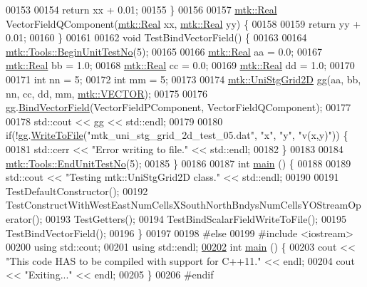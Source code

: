 \begin{DoxyCode}
00153 
00154   \textcolor{keywordflow}{return} xx + 0.01;
00155 \}
00156 
00157 \hyperlink{group__c01-roots_gac080bbbf5cbb5502c9f00405f894857d}{mtk::Real} VectorFieldQComponent(\hyperlink{group__c01-roots_gac080bbbf5cbb5502c9f00405f894857d}{mtk::Real} xx, \hyperlink{group__c01-roots_gac080bbbf5cbb5502c9f00405f894857d}{mtk::Real} yy) \{
00158 
00159   \textcolor{keywordflow}{return} yy + 0.01;
00160 \}
00161 
00162 \textcolor{keywordtype}{void} TestBindVectorField() \{
00163 
00164   \hyperlink{classmtk_1_1Tools_a26ee906d28523378522a75e25c3a4e19}{mtk::Tools::BeginUnitTestNo}(5);
00165 
00166   \hyperlink{group__c01-roots_gac080bbbf5cbb5502c9f00405f894857d}{mtk::Real} aa = 0.0;
00167   \hyperlink{group__c01-roots_gac080bbbf5cbb5502c9f00405f894857d}{mtk::Real} bb = 1.0;
00168   \hyperlink{group__c01-roots_gac080bbbf5cbb5502c9f00405f894857d}{mtk::Real} cc = 0.0;
00169   \hyperlink{group__c01-roots_gac080bbbf5cbb5502c9f00405f894857d}{mtk::Real} dd = 1.0;
00170 
00171   \textcolor{keywordtype}{int} nn = 5;
00172   \textcolor{keywordtype}{int} mm = 5;
00173 
00174   \hyperlink{classmtk_1_1UniStgGrid2D}{mtk::UniStgGrid2D} gg(aa, bb, nn, cc, dd, mm, \hyperlink{namespacemtk_ga4c54f2a329cfb4e56213b02a259d19e2a3d8cb27a993651a74d67fb8c98ae91b2}{mtk::VECTOR});
00175 
00176   gg.\hyperlink{classmtk_1_1UniStgGrid2D_a1cba89c285973514c1351760d598c52b}{BindVectorField}(VectorFieldPComponent, VectorFieldQComponent);
00177 
00178   std::cout << gg << std::endl;
00179 
00180   \textcolor{keywordflow}{if}(!gg.\hyperlink{classmtk_1_1UniStgGrid2D_a3507e3cf41631e5a5801af8ee6e233b0}{WriteToFile}(\textcolor{stringliteral}{"mtk\_uni\_stg\_grid\_2d\_test\_05.dat"}, \textcolor{stringliteral}{"x"}, \textcolor{stringliteral}{"y"}, \textcolor{stringliteral}{"v(x,y)"})) \{
00181     std::cerr << \textcolor{stringliteral}{"Error writing to file."} << std::endl;
00182   \}
00183 
00184   \hyperlink{classmtk_1_1Tools_ad8cf0085133dd40c913fe195bc5b9694}{mtk::Tools::EndUnitTestNo}(5);
00185 \}
00186 
00187 \textcolor{keywordtype}{int} \hyperlink{mtk__uni__stg__grid__2d__test_8cc_ae66f6b31b5ad750f1fe042a706a4e3d4}{main} () \{
00188 
00189   std::cout << \textcolor{stringliteral}{"Testing mtk::UniStgGrid2D class."} << std::endl;
00190 
00191   TestDefaultConstructor();
00192   TestConstructWithWestEastNumCellsXSouthNorthBndysNumCellsYOStreamOperator();
00193   TestGetters();
00194   TestBindScalarFieldWriteToFile();
00195   TestBindVectorField();
00196 \}
00197 
00198 \textcolor{preprocessor}{#else}
00199 \textcolor{preprocessor}{#include <iostream>}
00200 \textcolor{keyword}{using} std::cout;
00201 \textcolor{keyword}{using} std::endl;
\hypertarget{mtk__uni__stg__grid__2d__test_8cc_source_l00202}{}\hyperlink{mtk__uni__stg__grid__2d__test_8cc_ae66f6b31b5ad750f1fe042a706a4e3d4}{00202} \textcolor{keywordtype}{int} \hyperlink{mtk__uni__stg__grid__2d__test_8cc_ae66f6b31b5ad750f1fe042a706a4e3d4}{main} () \{
00203   cout << \textcolor{stringliteral}{"This code HAS to be compiled with support for C++11."} << endl;
00204   cout << \textcolor{stringliteral}{"Exiting..."} << endl;
00205 \}
00206 \textcolor{preprocessor}{#endif}
\end{DoxyCode}
